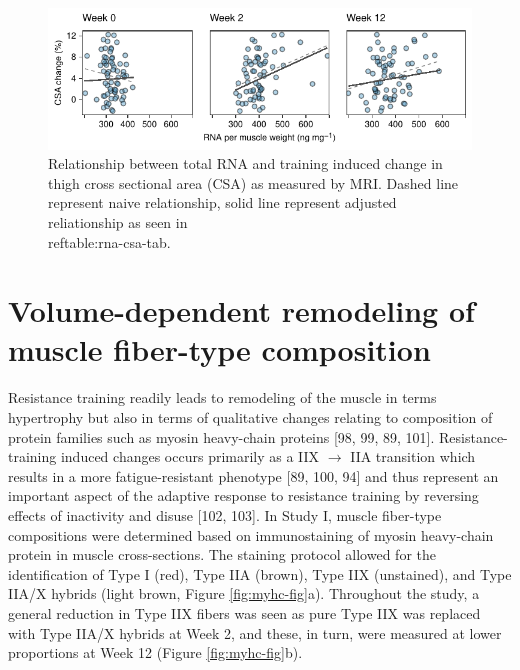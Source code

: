 \documentclass[twoside,10pt]{gihclass} %
\begin{document}
\begin{figure}

{\centering \includegraphics{thesis_files/figure-latex/rrna-csa-fig-1} 

}

\caption[Relationship between total RNA and training induced muscle growth]{Relationship between total RNA and training induced change in thigh cross sectional area (CSA) as measured by MRI. Dashed line represent naive relationship, solid line represent adjusted reliationship as seen in \\ref{table:rna-csa-tab}.}\label{fig:rrna-csa-fig}
\end{figure}
\hypertarget{volume-dependent-remodeling-of-muscle-fiber-type-composition}{%
\section{Volume-dependent remodeling of muscle fiber-type composition}\label{volume-dependent-remodeling-of-muscle-fiber-type-composition}}

Resistance training readily leads to remodeling of the muscle in terms hypertrophy but also in terms of qualitative changes relating to composition of protein families such as myosin heavy-chain proteins
{[}98, 99, 89, 101{]}.
Resistance-training induced changes occurs primarily as a IIX \(\rightarrow\) IIA transition which results in a more fatigue-resistant phenotype
{[}89, 100, 94{]}
and thus represent an important aspect of the adaptive response to resistance training by reversing effects of inactivity and disuse
{[}102, 103{]}.
In Study I, muscle fiber-type compositions were determined based on immunostaining of myosin heavy-chain protein in muscle cross-sections. The staining protocol allowed for the identification of Type I (red), Type IIA (brown), Type IIX (unstained), and Type IIA/X hybrids (light brown, Figure \ref{fig:myhc-fig}a). Throughout the study, a general reduction in Type IIX fibers was seen as pure Type IIX was replaced with Type IIA/X hybrids at Week 2, and these, in turn, were measured at lower proportions at Week 12 (Figure \ref{fig:myhc-fig}b).
\end{document}
